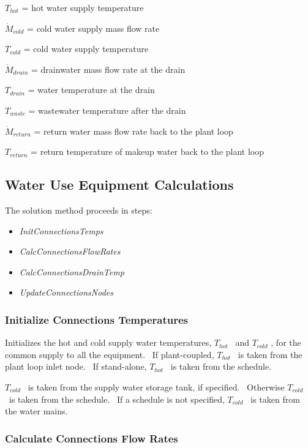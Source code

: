 \({T_{hot}}\) = hot water supply temperature

\({\dot M_{cold}}\) = cold water supply mass flow rate

\({T_{cold}}\) = cold water supply temperature

\({\dot M_{drain}}\) = drainwater mass flow rate at the drain

\({T_{drain}}\) = water temperature at the drain

\({T_{waste}}\) = wastewater temperature after the drain

\({\dot M_{return}}\) = return water mass flow rate back to the plant loop

\({T_{return}}\) = return temperature of makeup water back to the plant loop

\subsection{Water Use Equipment Calculations}\label{water-use-equipment-calculations}

The solution method proceeds in steps:

\begin{itemize}
\item
  \emph{InitConnectionsTemps}
\item
  \emph{CalcConnectionsFlowRates}
\item
  \emph{CalcConnectionsDrainTemp}
\item
  \emph{UpdateConnectionsNodes}
\end{itemize}

\subsubsection{Initialize Connections Temperatures}\label{initialize-connections-temperatures}

Initializes the hot and cold supply water temperatures, \({T_{hot}}\) ~and \({T_{cold}}\) , for the common supply to all the equipment.~ If plant-coupled, \({T_{hot}}\) ~is taken from the plant loop inlet node.~ If stand-alone, \({T_{hot}}\) ~is taken from the schedule.

\({T_{cold}}\) ~is taken from the supply water storage tank, if specified.~ Otherwise \({T_{cold}}\) ~is taken from the schedule.~ If a schedule is not specified, \({T_{cold}}\) ~is taken from the water mains.

\subsubsection{Calculate Connections Flow Rates}\label{calculate-connections-flow-rates}

